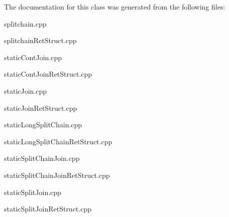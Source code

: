 The documentation for this class was generated from the following files\+:\begin{DoxyCompactItemize}
\item 
splitchain.\+cpp\item 
splitchain\+Ret\+Struct.\+cpp\item 
static\+Cont\+Join.\+cpp\item 
static\+Cont\+Join\+Ret\+Struct.\+cpp\item 
static\+Join.\+cpp\item 
static\+Join\+Ret\+Struct.\+cpp\item 
static\+Long\+Split\+Chain.\+cpp\item 
static\+Long\+Split\+Chain\+Ret\+Struct.\+cpp\item 
static\+Split\+Chain\+Join.\+cpp\item 
static\+Split\+Chain\+Join\+Ret\+Struct.\+cpp\item 
static\+Split\+Join.\+cpp\item 
static\+Split\+Join\+Ret\+Struct.\+cpp\end{DoxyCompactItemize}
